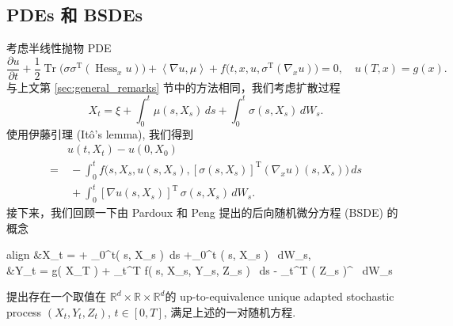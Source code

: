 \documentclass[12pt,AutoFakeBold,AutoFakeSlant]{article}
\theoremstyle{definition}
\DeclareMathOperator{\Tr}{Tr}
\newcommand{\R}{\mathbb{R}}
\newcommand{\bx}{{x}}
\newcommand{\bX}{{X}}
\begin{document}
	\subsection{PDEs 和 BSDEs}
		考虑半线性抛物 PDE
		\begin{equation}
			\label{eq:PDE}
			\frac{ \partial u}{ \partial t } + \frac{1}{2} \! \Tr\!\big( \sigma \sigma^{\operatorname{T}} (\operatorname{Hess}_{\bx} u) \big) +\left< \nabla u, \mu \right> +f\big( t, \bx, u, \sigma^{\operatorname{T}} (\nabla_x u) \big) = 0, \quad u(T, \bx) = g(\bx).
		\end{equation}
		与上文第 \ref{sec:general_remarks} 节中的方法相同，我们考虑扩散过程
		\begin{equation}
			\bX_t = \xi + \int_0^t\mu( s, \bX_s )\, ds +\int_0^t \sigma( s, \bX_s ) \, d W_s.
		\end{equation}
		使用伊藤引理 (It\^{o}'s lemma), 我们得到
		\begin{equation}
			\begin{split}
					&u(t, \bX_t) - u(0, \bX_0)\\
				= 	&~-\int_0^t f\big( s, \bX_s, u(s,\bX_s), [ \sigma( s, \bX_s ) ]^{ \operatorname{T} } ( \nabla_x u )( s, \bX_s ) \big) \, ds \\
					&~+ \int_0^t [ \nabla u( s, \bX_s ) ]^{ \operatorname{T} } \,\sigma( s, \bX_s )\, d W_s.
			\end{split}
		\end{equation}
		接下来，我们回顾一下由 Pardoux 和 Peng \cite{Pardoux1992} 提出的后向随机微分方程 (BSDE) 的概念 
		\begin{empheq}[left=\empheqlbrace]{align}
		\label{eq:BSDE_1}
			&\bX_t = \xi + \int_0^t\mu( s, \bX_s )\, ds +\int_0^t \sigma( s, X_s ) \, dW_s, \\
			&Y_t = g( X_T ) + \int_t^T f( s, X_s, Y_s, Z_s ) \, ds 
			- \int_t^T ( Z_s )^{  } \, dW_s
		\label{eq:BSDE_2}
		\end{empheq}
		\cite{Pardoux1992,Pardoux1999} 提出存在一个取值在 $ \R^d \times \R \times \R^d $的 up-to-equivalence unique adapted stochastic process $ ( X_t, Y_t, Z_t ) $, $ t \in [0,T] $, 满足上述的一对随机方程.
\end{document}
